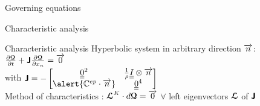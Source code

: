 \begin{frame}
\begin{block}{Governing equations}
\begin{overprint}
\begin{block}{Characteristic analysis}
      \end{block}
      \begin{block}{Characteristic analysis}
        Hyperbolic system in arbitrary direction ${\overrightarrow{n}}$: $\frac{\partial {\boldsymbol{\mathcal{Q}}}}{\partial t} + \boldsymbol{\mathsf{J}} \frac{\partial {\boldsymbol{\mathcal{Q}}}}{\partial x_n} ={\overrightarrow{0}}$ \\
        with $\Jbsf=-\matrice{\tens{0}^2 & \frac{1}{\rho}\tens{I}\otimes\vect{n} \\ \alert{\Cbb^{ep}\cdot \vect{n}} & \tens{0}^4}$\\
        Method of characteristics \cite{Courant}: ${\boldsymbol{\mathcal{L}}}^K \cdot d{\boldsymbol{\mathcal{Q}}} = {\overrightarrow{0}}$ $\forall$ left eigenvectors ${\boldsymbol{\mathcal{L}}}$ of $\boldsymbol{\mathsf{J}}$
      \end{block}
    \end{overprint}    
  \end{block}
\end{frame}





